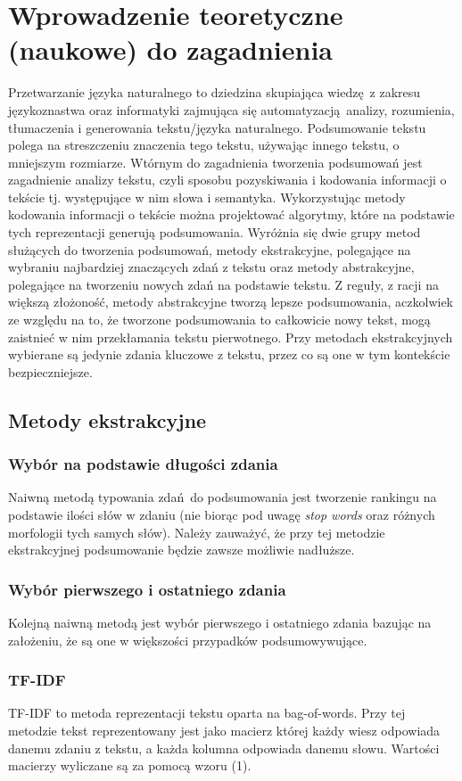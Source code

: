 \documentclass{article}
\begin{document}
\section{Wprowadzenie teoretyczne (naukowe) do zagadnienia}
Przetwarzanie języka naturalnego to dziedzina skupiająca wiedzę z zakresu
językoznastwa oraz informatyki zajmująca się automatyzacją analizy, rozumienia,
tłumaczenia i generowania tekstu/języka naturalnego.
Podsumowanie tekstu polega na streszczeniu znaczenia tego tekstu, używając
innego tekstu, o mniejszym rozmiarze. Wtórnym do zagadnienia tworzenia podsumowań
jest zagadnienie analizy tekstu, czyli sposobu pozyskiwania i kodowania informacji o tekście
tj. występujące w nim słowa i semantyka. Wykorzystując metody kodowania informacji o tekście
można projektować algorytmy, które na podstawie tych reprezentacji generują podsumowania.
Wyróżnia się dwie grupy metod służących do tworzenia podsumowań, metody ekstrakcyjne,
polegające na wybraniu najbardziej znaczących zdań z tekstu oraz metody abstrakcyjne,
polegające na tworzeniu nowych zdań na podstawie tekstu. Z reguły, z racji na większą złożoność,
metody abstrakcyjne tworzą lepsze podsumowania, aczkolwiek ze względu na to, że tworzone
podsumowania to całkowicie nowy tekst, mogą zaistnieć w nim przekłamania tekstu pierwotnego. Przy metodach
ekstrakcyjnych wybierane są jedynie zdania kluczowe z tekstu, przez co są one w tym kontekście bezpieczniejsze.

\subsection{Metody ekstrakcyjne}
\subsubsection{Wybór na podstawie długości zdania}
Naiwną metodą typowania zdań do podsumowania jest tworzenie rankingu na podstawie
ilości słów w zdaniu (nie biorąc pod uwagę \textit{stop words} oraz różnych morfologii 
tych samych słów). Należy zauważyć, że przy tej metodzie ekstrakcyjnej podsumowanie
będzie zawsze możliwie nadłuższe.
\subsubsection{Wybór pierwszego i ostatniego zdania}
Kolejną naiwną metodą jest wybór pierwszego i ostatniego zdania bazując na założeniu, że
są one w większości przypadków podsumowywujące.
\subsubsection{TF-IDF}
TF-IDF to metoda reprezentacji tekstu oparta na bag-of-words. Przy tej metodzie tekst 
reprezentowany jest jako macierz której każdy wiesz odpowiada danemu zdaniu z tekstu, a 
każda kolumna odpowiada danemu słowu. Wartości macierzy wyliczane są za pomocą wzoru (1).
\end{document}
